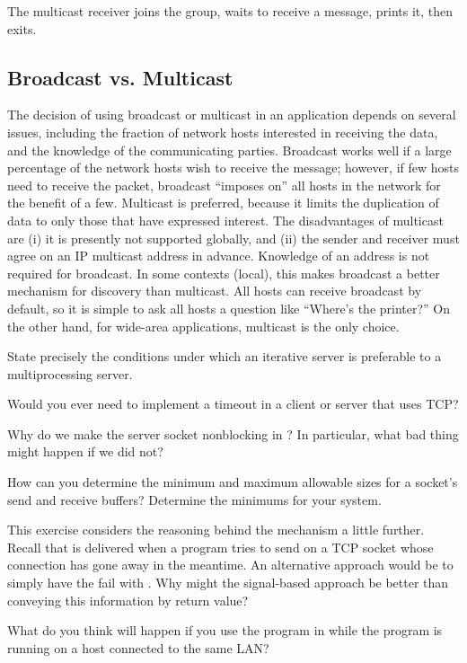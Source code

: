 
The multicast receiver joins the group, waits to receive a message,
prints it, then exits.

\subsection{Broadcast vs. Multicast}

The decision of using broadcast or multicast in an application
depends on several issues, including the fraction
of network hosts interested in
receiving the data, and the knowledge of the communicating parties.
Broadcast works well if a large percentage of the network hosts wish
to receive the message; however, if few hosts need to receive the
packet, broadcast ``imposes on'' all hosts in the network for the
benefit of a few.
Multicast is preferred, because it limits the duplication of data to
only those that have  expressed interest.
%
The disadvantages of multicast are (i) it is presently not supported globally,
and (ii) the sender and receiver must
agree on an IP multicast address in advance.
Knowledge of an address is not required
for broadcast.  In some contexts (local), this makes broadcast a better
mechanism for discovery than multicast.  All hosts can receive
broadcast by default, so it is simple to ask all hosts a question like
``Where's the printer?''  On the other hand, for wide-area applications,
multicast is the only choice.

\begin{exercises}

\item State precisely the conditions under which an iterative server
is preferable to a multiprocessing server.

\item Would you ever need to implement a timeout in a client or
  server that uses TCP?

\item Why do we make the server socket nonblocking in
?  In particular, what bad thing might
happen if we did not?


\item How can you determine the minimum and maximum allowable sizes for
  a socket's send and receive buffers?  Determine the minimums for
  your system.

\item \label{ex:sigpipe} This exercise considers the
reasoning behind the  mechanism a little further.
Recall that  is delivered when a program tries  to
send on a TCP socket whose connection has gone away in the meantime.
An alternative approach would be to simply have the  fail
with .  Why might the signal-based approach be
better than conveying this information by return value?

\item What do you think will happen if you use the program in
   while the program
   is running on a host connected to the same LAN?

\end{exercises}
